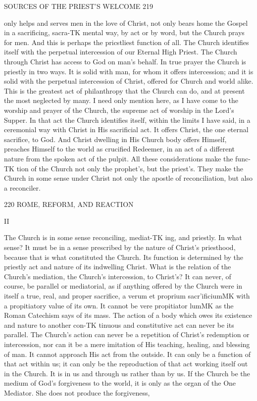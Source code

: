 \documentclass[12pt,a5paper,twoside]{book}
\begin{document}
{{SOURCES OF THE PRIEST'S WELCOME 219 

only helps and serves men in the love of Christ, not 
only bears home the Gospel in a sacrificing, sacra-TK
mental way, by act or by word, but the Church 
prays for men. And this is perhaps the pricstliest 
function of all. The Church identifies itself with 
the perpetual intercession of our Eternal High Priest. 
The Church through Christ has access to God on 
man's behalf. In true prayer the Church is priestly 
in two ways. It is solid with man, for whom it 
offers intercession; and it is solid with the perpetual 
intercession of Christ, offered for Church and world 
alike. This is the greatest act of philanthropy that 
the Church can do, and at present the most neglected 
by many. I need only mention here, as I have come 
to the worship and prayer of the Church, the supreme 
act of worship in the Lord's Supper. In that act the 
Church identifies itself, within the limits I have said, 
in a ceremonial way with Christ in His sacrificial act. 
It offers Christ, the one eternal sacrifice, to God. And 
Christ dwelling in His Church body offers Himself, 
preaches Himself to the world as crucified Redeemer, 
in an act of a different nature from the spoken act of 
the pulpit. All these considerations make the func-TK
tion of the Church not only the prophet's, but the 
priest's. They make the Church in some sense under 
Christ not only the apostle of reconciliation, but also 
a reconciler. 



220 ROME, REFORM, AND REACTION 

II 

The Church is in some sense reconciling, mediat-TK
ing, and priestly. In what sense? It must be in a 
sense prescribed by the nature of Christ's priesthood, 
because that is what constituted the Church. Its 
function is determined by the priestly act and nature 
of its indwelling Christ. What is the relation of the 
Church's mediation, the Church's intercession, to 
Christ's? It can never, of course, be parallel or 
mediatorial, as if anything offered by the Church were 
in itself a true, real, and proper sacrifice, a verum et 
proprium sacr'ificiumMK with a propitiatory value of its 
own. It cannot be vere propitiator lumMK as the Roman 
Catechism says of its mass. The action of a body 
which owes its existence and nature to another con-TK
tinuous and constitutive act can never be its parallel. 
The Church's action can never be a repetition of 
Christ's redemption or intercession, nor can it be a 
mere imitation of His teaching, healing, and blessing 
of man. It cannot approach His act from the outside. 
It can only be a function of that act within us; it can 
only be the reproduction of that act working itself out 
in the Church. It is in us and through us rather 
than by us. If the Church be the medium of God's 
forgiveness to the world, it is only as the organ of the 
One Mediator. She does not produce the forgiveness, 



}}
\end{document}
